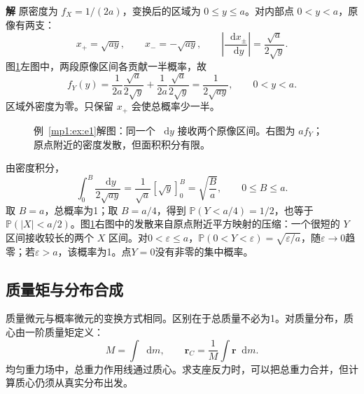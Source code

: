 \documentclass[11pt,openany,fontset=fandol]{ctexbook}
\theoremstyle{definition}\newtheorem{example}{例}[chapter]\newtheorem{exercise}{习题}[chapter]
\newcommand{\SolutionStart}{\par\medskip\ifdim\pagetotal>0pt\ifdim\dimexpr\pagegoal-\pagetotal\relax<3\baselineskip\newpage\fi\fi\noindent\textbf{解}\quad\ignorespaces}
\newenvironment{solution}{\SolutionStart}{\par\medskip}
\newcommand{\dd}{\mathop{}\!\mathrm d}\newcommand{\ee}{\mathrm e}\newcommand{\vct}[1]{\bm{#1}}
\newcommand{\Prob}{\mathbb P}\newcommand{\avg}[1]{\left\langle#1\right\rangle}
\begin{document}
\begin{solution}
原密度为 $f_X=1/(2a)$，变换后的区域为 $0\le y\le a$。对内部点 $0<y<a$，原像有两支：
\[
x_+=\sqrt{ay},\qquad x_-=-\sqrt{ay},\qquad
\left|\frac{\dd x_\pm}{\dd y}\right|=\frac{\sqrt a}{2\sqrt y}.
\]
图\ref{mp1:fig:e1-s}左图中，两段原像区间各贡献一半概率，故
\[
f_Y(y)=\frac1{2a}\frac{\sqrt a}{2\sqrt y}
+\frac1{2a}\frac{\sqrt a}{2\sqrt y}
=\frac1{2\sqrt{ay}},\qquad 0<y<a.
\]
区域外密度为零。只保留 $x_+$ 会使总概率少一半。

\begin{figure}[H]\centering

\caption{例~\ref{mp1:ex:e1}解图：同一个 $\dd y$ 接收两个原像区间。右图为 $a f_Y$；原点附近的密度发散，但面积积分有限。}\label{mp1:fig:e1-s}
\end{figure}

由密度积分，
\[
\int_0^B\frac{\dd y}{2\sqrt{ay}}
=\frac1{\sqrt a}\left[\sqrt y\right]_0^B
=\sqrt{\frac Ba},\qquad 0\le B\le a.
\]
取 $B=a$，总概率为1；取 $B=a/4$，得到 $\Prob(Y<a/4)=1/2$，也等于 $\Prob(|X|<a/2)$。图\ref{mp1:fig:e1-s}右图中的发散来自原点附近平方映射的压缩：一个很短的 $Y$ 区间接收较长的两个 $X$ 区间。对$0<\varepsilon\le a$，$\Prob(0<Y<\varepsilon)=\sqrt{\varepsilon/a}$，随$\varepsilon\to0$趋零；若$\varepsilon>a$，该概率为1。点$Y=0$没有非零的集中概率。
\end{solution}

\subsection{质量矩与分布合成}
质量微元与概率微元的变换方式相同。区别在于总质量不必为1。对质量分布，质心由一阶质量矩定义：
\[
M=\int\dd m,\qquad \vct r_C=\frac1M\int\vct r\dd m.
\]
均匀重力场中，总重力作用线通过质心。求支座反力时，可以把总重力合并，但计算质心仍须从真实分布出发。
\end{document}

